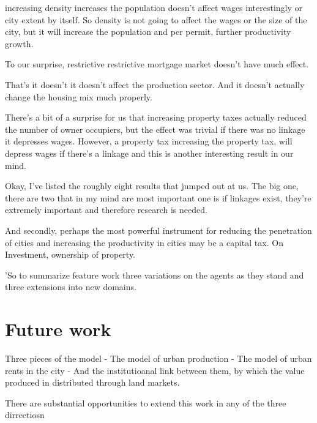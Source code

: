 \documentclass[]{article}
\begin{document}
increasing density increases the population doesn't affect wages interestingly or city extent by itself. So density is not going to affect the wages or the size of the city, but it will increase the population and per permit, further productivity growth.


To our surprise, restrictive restrictive mortgage market doesn't have much effect.

That's it doesn't it doesn't affect the production sector. And it doesn't actually change the housing mix much properly. 

There's a bit of a surprise for us that increasing property taxes actually reduced the number of owner occupiers, but the effect was trivial if there was no linkage it depresses wages. However, a property tax increasing the property tax, will depress wages if there's a linkage and this is another interesting result in our mind. 

Okay, I've listed the roughly eight results that jumped out at us. The big one, there are two that in my mind are most important one is if linkages exist, they're extremely important and therefore research is needed.

And secondly, perhaps the most powerful instrument for reducing the penetration of cities and increasing the productivity in cities may be a capital tax. On Investment, ownership of property.

'So to summarize feature work three variations on the agents as they stand and three extensions into new domains. 

\section{Future work}

Three pieces of the model 
- The model of urban production
- The model of urban rents in the city
- And the institutioanal link between them, by which the value produced in distributed through land markets.

There are substantial opportunities to extend this work in any of the three dirrectiosn
\end{document}
